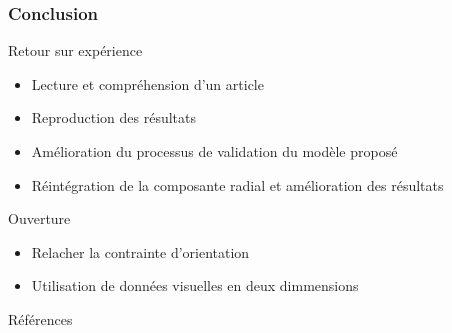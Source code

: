 \documentclass{beamer}
\begin{document}
\begin{frame}
  \frametitle{Conclusion}
  \begin{block}{Retour sur expérience}
    \begin{itemize}
      \item Lecture et compréhension d'un article
      \item Reproduction des résultats
      \item Amélioration du processus de validation du modèle proposé
      \item Réintégration de la composante radial et amélioration des résultats    
    \end{itemize}
  \end{block}
  \begin{block}{Ouverture}
    \begin{itemize}
      \item Relacher la contrainte d'orientation
      \item Utilisation de données visuelles en deux dimmensions
    \end{itemize}
  \end{block}
\end{frame}

\begin{frame}{Références}
  \nocite{*}
  
  
\end{frame}
\end{document}
